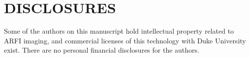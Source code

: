 \section*{DISCLOSURES}
Some of the authors on this manuscript hold intellectual property related to
ARFI imaging, and commercial licenses of this technology with Duke University
exist.  There are no personal financial disclosures for the authors.
